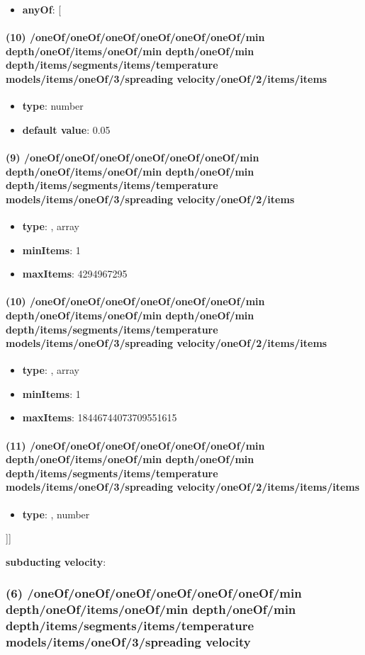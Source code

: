 \begin{itemize}[leftmargin=10em]\item {\bf anyOf}: [\end{itemize}\paragraph{(10) /oneOf/oneOf/oneOf/oneOf/oneOf/oneOf/min depth/oneOf/items/oneOf/min depth/oneOf/min depth/items/segments/items/temperature models/items/oneOf/3/spreading velocity/oneOf/2/items/items}
\begin{itemize}[leftmargin=10em]\item {\bf type}: number\item {\bf default value}: 0.05
\end{itemize}\paragraph{(9) /oneOf/oneOf/oneOf/oneOf/oneOf/oneOf/min depth/oneOf/items/oneOf/min depth/oneOf/min depth/items/segments/items/temperature models/items/oneOf/3/spreading velocity/oneOf/2/items}
\begin{itemize}[leftmargin=9em]\item {\bf type}: , array\item {\bf minItems}: 1
\item {\bf maxItems}: 4294967295
\end{itemize}\paragraph{(10) /oneOf/oneOf/oneOf/oneOf/oneOf/oneOf/min depth/oneOf/items/oneOf/min depth/oneOf/min depth/items/segments/items/temperature models/items/oneOf/3/spreading velocity/oneOf/2/items/items}
\begin{itemize}[leftmargin=10em]\item {\bf type}: , array\item {\bf minItems}: 1
\item {\bf maxItems}: 18446744073709551615
\end{itemize}\paragraph{(11) /oneOf/oneOf/oneOf/oneOf/oneOf/oneOf/min depth/oneOf/items/oneOf/min depth/oneOf/min depth/items/segments/items/temperature models/items/oneOf/3/spreading velocity/oneOf/2/items/items/items}
\begin{itemize}[leftmargin=11em]\item {\bf type}: , number\end{itemize}]]\item {\bf subducting velocity}: \subsubsection{(6) /oneOf/oneOf/oneOf/oneOf/oneOf/oneOf/min depth/oneOf/items/oneOf/min depth/oneOf/min depth/items/segments/items/temperature models/items/oneOf/3/spreading velocity}
